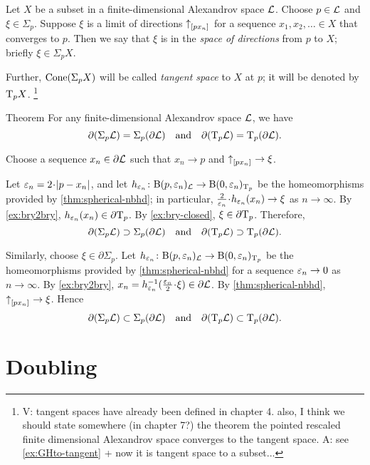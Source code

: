 Let $X$ be a subset in a finite-dimensional Alexandrov space $\mathcal{L}$.
Choose $p\in \mathcal{L}$ and $\xi\in \Sigma_p$.
Suppose $\xi$ is a limit of directions ${\uparrow}_{[{p}{x_n}]_{{}}}$ for a sequence $x_1,x_2,\dots{}\in X$ that converges to $p$.
Then we say that $\xi$ is in the \emph{space of directions} from $p$ to $X$;
briefly $\xi\in\Sigma_pX$.

Further, $\mathop{\rm Cone}\nolimits(\Sigma_pX)$ will be called \emph{tangent space} to $X$ at $p$;
it will be denoted by $\mathrm{T}_pX$.
\footnote{{\red V: tangent spaces have already been defined in chapter 4. also, I think we should state somewhere (in chapter 7?) the theorem the pointed rescaled  finite dimensional Alexandrov space converges to the tangent space.} A: see \ref{ex:GHto-tangent} + now it is tangent space to a subset...}

\begin{thm}{Theorem}\label{thm:partial-Sigma}
For any finite-dimensional Alexandrov space $\mathcal{L}$, we have
\[\partial (\Sigma_p\mathcal{L})=\Sigma_p(\partial\mathcal{L})
\quad\text{and}\quad
\partial(\mathrm{T}_p\mathcal{L})=\mathrm{T}_p(\partial\mathcal{L}).\]
\end{thm}

Choose a sequence $x_n\in \partial \mathcal{L}$ such that $x_n\to p$ and ${\uparrow}_{[{p}{x_n}]_{{}}}\to\xi$.

Let $\eps_n=2\cdot \dist{p}{x_n}{}$,
and let $h_{\varepsilon_n}\colon\mathrm{B}{}(p,\varepsilon_n)_{\mathcal{L}}\to \mathrm{B}{}(0,\varepsilon_n)_{\mathrm{T}_p}$ be the homeomorphisms provided by \ref{thm:spherical-nbhd};
in particular, $\tfrac2{\eps_n}\cdot h_{\eps_n}(x_n)\to \xi$ as $n\to\infty$.
By \ref{ex:bry2bry}, $h_{\varepsilon_n}(x_n)\in \partial \mathrm{T}_p$.
By \ref{ex:bry-closed}, $\xi\in \partial \mathrm{T}_p$.
Therefore,
\[\partial (\Sigma_p\mathcal{L})\supset\Sigma_p(\partial\mathcal{L})
\quad\text{and}\quad
\partial(\mathrm{T}_p\mathcal{L})\supset\mathrm{T}_p(\partial\mathcal{L}).\]

Similarly, choose $\xi\in\partial\Sigma_p$.
Let $h_{\varepsilon_n}\colon\mathrm{B}{}(p,\varepsilon_n)_{\mathcal{L}}\to \mathrm{B}{}(0,\varepsilon_n)_{\mathrm{T}_p}$ be the homeomorphisms provided by \ref{thm:spherical-nbhd} for a sequence $\varepsilon_n\to 0$ as $n\to\infty$.
By \ref{ex:bry2bry}, $x_n=h_{\eps_n}^{-1}(\tfrac{\eps_n}2\cdot\xi)\in \partial \spc{L}$.
By \ref{thm:spherical-nbhd}, ${\uparrow}_{[{p}{x_n}]_{{}}}\to \xi$.
Hence
\[\partial (\Sigma_p\mathcal{L})\subset\Sigma_p(\partial\mathcal{L})
\quad\text{and}\quad\partial(\mathrm{T}_p\mathcal{L})\subset\mathrm{T}_p(\partial\mathcal{L}).\]
\qedsf

\section{Doubling}

